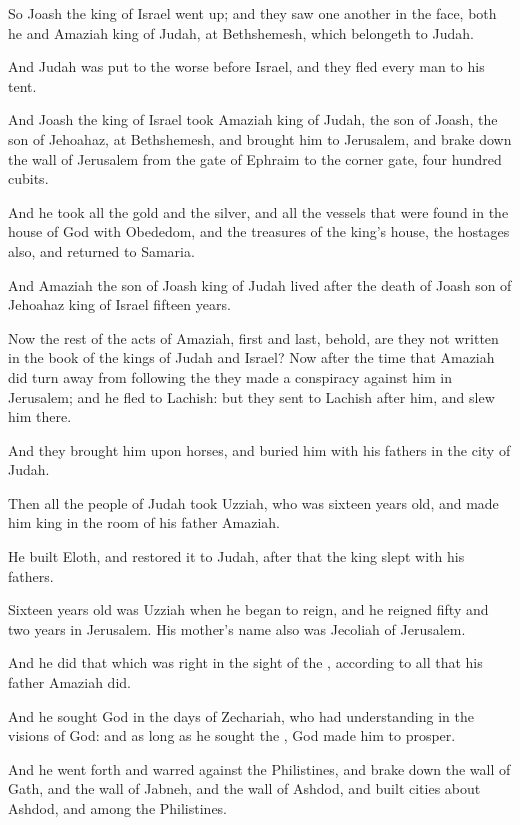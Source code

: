 \Verse So Joash the king of Israel went up; and they saw one another in the face, both he and Amaziah king of Judah, at Bethshemesh, which belongeth to Judah.

\Verse And Judah was put to the worse before Israel, and they fled every man to his tent.

\Verse And Joash the king of Israel took Amaziah king of Judah, the son of Joash, the son of Jehoahaz, at Bethshemesh, and brought him to Jerusalem, and brake down the wall of Jerusalem from the gate of Ephraim to the corner gate, four hundred cubits.

\Verse And he took all the gold and the silver, and all the vessels that were found in the house of God with Obededom, and the treasures of the king's house, the hostages also, and returned to Samaria.

\Verse And Amaziah the son of Joash king of Judah lived after the death of Joash son of Jehoahaz king of Israel fifteen years.

\Verse Now the rest of the acts of Amaziah, first and last, behold, are they not written in the book of the kings of Judah and Israel?  \Verse Now after the time that Amaziah did turn away from following the \LORD they made a conspiracy against him in Jerusalem; and he fled to Lachish: but they sent to Lachish after him, and slew him there.

\Verse And they brought him upon horses, and buried him with his fathers in the city of Judah.


\Chapter
\Verse Then all the people of Judah took Uzziah, who was sixteen years old, and made him king in the room of his father Amaziah.

\Verse He built Eloth, and restored it to Judah, after that the king slept with his fathers.

\Verse Sixteen years old was Uzziah when he began to reign, and he reigned fifty and two years in Jerusalem. His mother's name also was Jecoliah of Jerusalem.

\Verse And he did that which was right in the sight of the \LORD, according to all that his father Amaziah did.

\Verse And he sought God in the days of Zechariah, who had understanding in the visions of God: and as long as he sought the \LORD, God made him to prosper.

\Verse And he went forth and warred against the Philistines, and brake down the wall of Gath, and the wall of Jabneh, and the wall of Ashdod, and built cities about Ashdod, and among the Philistines.

